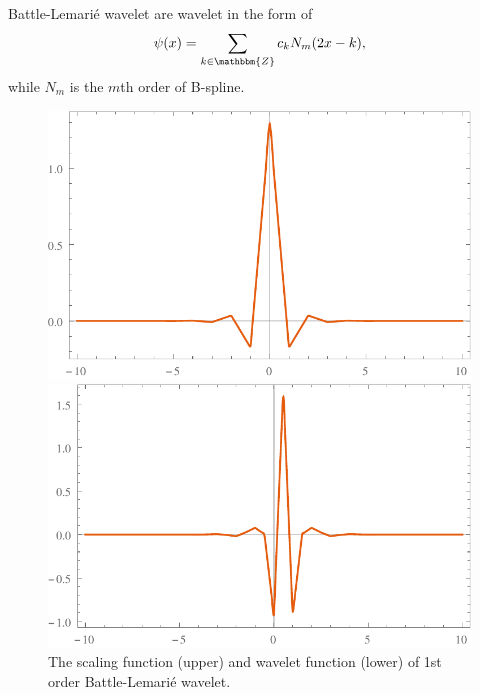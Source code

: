 \documentclass{book}
\begin{document}
Battle-Lemari{\'e} wavelet are wavelet in the form of
\[ \psi (x) = \sum_{k \in \mathbbm{Z}} c_k N_m (2 x - k), \]
while $N_m$ is the $m$th order of B-spline.

\begin{figure}[h]
  \includegraphics{Figures/BL1WaveletPhi.pdf}
  
  \includegraphics{Figures/BL1WaveletPsi.pdf}
  \caption{The scaling function (upper) and wavelet function (lower) of 1st
  order Battle-Lemari{\'e} wavelet.}
\end{figure}

\
\end{document}
